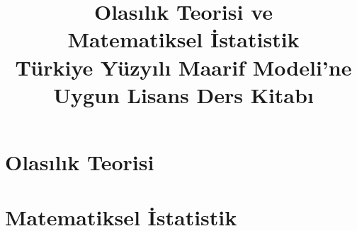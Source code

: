 \documentclass[12pt, a4paper, twoside]{book}
\title{%
  {\Huge\bfseries Olasılık Teorisi ve}\\[4pt]
  {\Huge\bfseries Matematiksel İstatistik}\\[12pt]
  {\large Türkiye Yüzyılı Maarif Modeli'ne Uygun Lisans Ders Kitabı}%
}
\author{}
\date{}
\begin{document}
\frontmatter
\maketitle
\tableofcontents

\mainmatter

\part{Olasılık Teorisi}













\part{Matematiksel İstatistik}










\appendix








\backmatter
\end{document}
